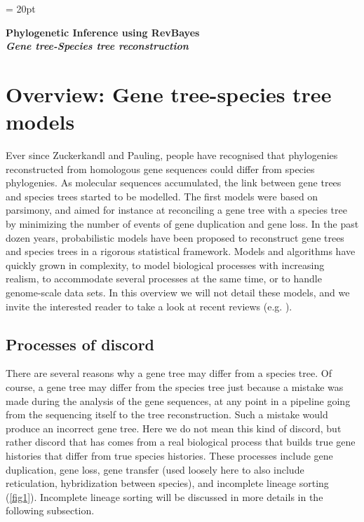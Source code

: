 \documentclass[11pt]{article}
\begin{document}
\renewcommand{\headrulewidth}{0.5pt}
\headsep = 20pt
\lhead{ }

\thispagestyle{plain}
\begin{center}

\textbf{\LARGE Phylogenetic Inference using RevBayes}\\\vspace{2mm}
\textbf{\it{\Large Gene tree-Species tree reconstruction}}\\\vspace{2mm}
\end{center}

\section*{Overview: Gene tree-species tree models}

Ever since Zuckerkandl and Pauling, people have recognised that phylogenies reconstructed from homologous gene sequences could differ from species phylogenies.
As molecular sequences accumulated, the link between gene trees and species trees started to be modelled. 
The first models were based on parsimony, and aimed for instance at reconciling a gene tree with a species tree by minimizing the number of events of gene duplication and gene loss. 
In the past dozen years, probabilistic models have been proposed to reconstruct gene trees and species trees in a rigorous statistical framework.
Models and algorithms have quickly grown in complexity, to model biological processes with increasing realism, to accommodate several processes at the same time, or to handle genome-scale data sets.
In this overview we will not detail these models, and we invite the interested reader to take a look at recent reviews (e.g. \citep{Szollosi2014}).

\subsection*{Processes of discord}
There are several reasons why a gene tree may differ from a species tree. 
Of course, a gene tree may differ from the species tree just because a mistake was made during the analysis of the gene sequences, at any point in a pipeline going from the sequencing itself to the tree reconstruction.
Such a mistake would produce an incorrect gene tree.
Here we do not mean this kind of discord, but rather discord that has comes from a real biological process that builds true gene histories that differ from true species histories.
These processes include gene duplication, gene loss, gene transfer (used loosely here to also include reticulation, hybridization between species), and incomplete lineage sorting (\ref{fig1}). 
Incomplete lineage sorting will be discussed in more details in the following subsection.
\end{document}
